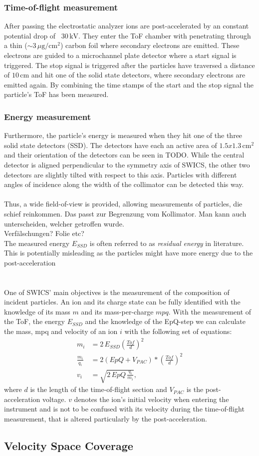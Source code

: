 \subsubsection{Time-of-flight measurement}
After passing the electrostatic analyzer ions are post-accelerated by an constant potential drop of ~$30\,\mathrm{kV}$. They enter the ToF chamber with penetrating through a thin ($\sim 3\,\mu \mathrm{g / cm^2}$) carbon foil where secondary electrons are emitted. These electrons are guided to a microchannel plate detector where a start signal is triggered. The stop signal is triggered after the particles have traversed a distance of $10\,\mathrm{cm}$ and hit one of the solid state detectors, where secondary electrons are emitted again. By combining the time stamps of the start and the stop signal the particle's ToF has been measured.
\subsubsection{Energy measurement}
Furthermore, the particle's energy is measured when they hit one of the three solid state detectors (SSD). The detectors have each an active area of $1.5 x 1.3 \,\mathrm{cm^2}$ and their orientation of the detectors can be seen in TODO. While the central detector is aligned perpendicular to the symmetry axis of SWICS, the other two detectors are slightly tilted with respect to this axis. Particles with different angles of incidence along the width of the collimator can be detected this way.
\\ \\
Thus, a wide field-of-view is provided, allowing measurements of particles, die schief reinkommen. Das passt zur Begrenzung vom Kollimator. Man kann auch unterscheiden, welcher getroffen wurde.\\
Verfälschungen? Folie etc? \\ 
The measured energy $E_{SSD}$ is often referred to as \textit{residual energy} in literature. This is potentially misleading as the particles might have more energy due to the post-acceleration 
\\ \\ \\
One of SWICS' main objectives is the measurement of the composition of incident particles. An ion and its charge state can be fully identified with the knowledge of its mass $m$ and its mass-per-charge $mpq$. 
With the measurement of the ToF, the energy $E_{SSD}$ and the knowledge of the EpQ-step we can calculate the mass, mpq and velocity of an ion $i$ with the following set of equations:
\begin{align*}
m_i &= 2\,E_{SSD} \left( \frac{Tof}{d}\right)^2 \\
\frac{m_i}{q_i} &= 2 \left(EpQ + V_{PAC}\right) * \left(\frac{Tof}{d}\right)^2 \\
v_i &= \sqrt{2\,EpQ\,\frac{q_i}{m_i}},
\end{align*}
where $d$ is the length of the time-of-flight section and $V_{PAC}$ is the post-acceleration voltage. $v$ denotes the ion's initial velocity when entering the instrument and is not to be confused with its velocity during the time-of-flight measurement, that is altered particularly by the post-acceleration.
\subsection{Velocity Space Coverage}